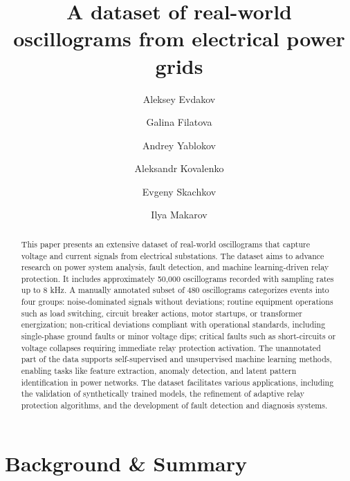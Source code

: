 \documentclass{article}
\begin{document}
\title{A dataset of real-world oscillograms from electrical power grids}

\date{}


\author[1,2]{Aleksey Evdakov}
\author[2]{Galina Filatova}
\author[2]{Andrey Yablokov}
\author[3,6]{Aleksandr Kovalenko}
\author[4]{Evgeny Skachkov}
\author[3,5,6]{Ilya Makarov}

            





\maketitle

\begin{abstract}
This paper presents an extensive dataset of real-world oscillograms that capture voltage and current signals from electrical substations. The dataset aims to advance research on power system analysis, fault detection, and machine learning-driven relay protection. It includes approximately 50,000 oscillograms recorded with sampling rates up to 8 kHz. A manually annotated subset of 480 oscillograms categorizes events into four groups: noise-dominated signals without deviations; routine equipment operations such as load switching, circuit breaker actions, motor startups, or transformer energization; non-critical deviations compliant with operational standards, including single-phase ground faults or minor voltage dips; critical faults such as short-circuits or voltage collapses requiring immediate relay protection activation. The unannotated part of the data supports self-supervised and unsupervised machine learning methods, enabling tasks like feature extraction, anomaly detection, and latent pattern identification in power networks. The dataset facilitates various applications, including the validation of synthetically trained models, the refinement of adaptive relay protection algorithms, and the development of fault detection and diagnosis systems.
\end{abstract}

\section*{Background \& Summary}
\end{document}
